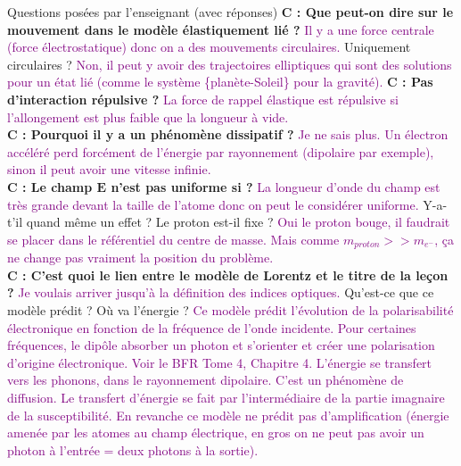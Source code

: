 \begin{reportBlock}{Questions posées par l’enseignant (avec réponses)}
  \textbf{C : Que peut-on dire sur le mouvement dans le modèle élastiquement lié ?}  \textcolor{purple}{Il y a une force centrale (force électrostatique) donc on a des mouvements circulaires.} Uniquement circulaires ? \textcolor{purple}{Non, il peut y avoir des trajectoires elliptiques qui sont des solutions pour un état lié (comme le système \{planète-Soleil\} pour la gravité).} \newline
  \textbf{C : Pas d'interaction répulsive ?}  \textcolor{purple}{La force de rappel élastique est répulsive si l'allongement est plus faible que la longueur à vide.}\\
  \textbf{C : Pourquoi il y a un phénomène dissipatif ?}  \textcolor{purple}{Je ne sais plus. Un électron accéléré perd forcément de l'énergie par rayonnement (dipolaire par exemple), sinon il peut avoir une vitesse infinie.}\\
  \textbf{C : Le champ $\mathbf{E}$ n'est pas uniforme si ?}  \textcolor{purple}{La longueur d'onde du champ est très grande devant la taille de l'atome donc on peut le considérer uniforme.} Y-a-t'il quand même un effet ? Le proton est-il fixe ? \textcolor{purple}{Oui le proton bouge, il faudrait se placer dans le référentiel du centre de masse. Mais comme $m_{proton}>>m_{e^-}$, ça ne change pas vraiment la position du problème.}\\
  \textbf{C : C'est quoi le lien entre le modèle de Lorentz et le titre de la leçon ?} \textcolor{purple}{Je voulais arriver jusqu'à la définition des indices optiques.} Qu'est-ce que ce modèle prédit ? Où va l'énergie ? \textcolor{purple}{Ce modèle prédit l'évolution de la polarisabilité électronique en fonction de la fréquence de l'onde incidente. Pour certaines fréquences, le dipôle absorber un photon et s'orienter et créer une polarisation d'origine  électronique. Voir le BFR Tome 4, Chapitre 4. L'énergie se transfert vers les phonons, dans le rayonnement dipolaire. C'est un phénomène de diffusion. Le transfert d'énergie se fait par l'intermédiaire de la partie imagnaire de la susceptibilité. En revanche ce modèle ne prédit pas d'amplification (énergie amenée par les atomes au champ électrique, en gros on ne peut pas avoir un photon à l'entrée = deux photons à la sortie).}\\

\end{reportBlock}

